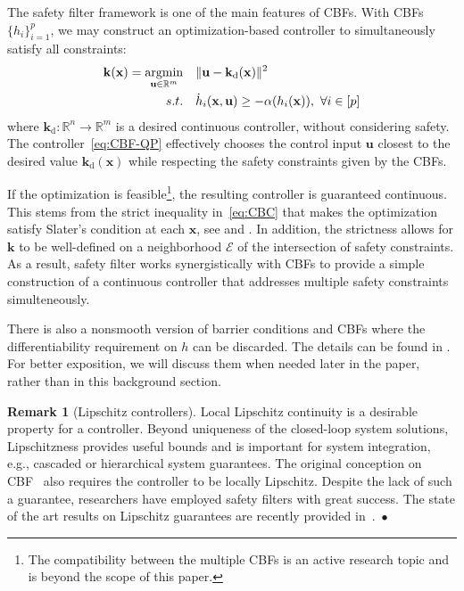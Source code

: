 \documentclass[10pt,a4paper]{amsart}
\newcommand{\real}{\mathbb{R}}
\newcommand{\until}[1]{[#1]}
\newcommand{\map}[3]{#1:#2 \rightarrow #3}
\newcommand{\Ec}{\mathcal{E}}
\theoremstyle{definition}
\newtheorem{remark}{Remark}
\newcommand{\bk}{\mathbf{k}}
\newcommand{\bu}{\mathbf{u}}
\newcommand{\bx}{\mathbf{x}}
\newcommand{\des}{{\operatorname{d}}}
\DeclareMathOperator*{\argmin}{argmin}
\begin{document}
The safety filter framework is one of the main features of CBFs. With CBFs $\{h_i\}_{i=1}^p$, we may construct an optimization-based controller to simultaneously satisfy all constraints:
\begin{align}\label{eq:CBF-QP}
    \bk(\bx)  =\argmin_{\bu\in\real^m} \quad & \|\bu-\bk_\des(\bx)\|^2                                                                  \\
             \textup{s.t.} \quad & \dot h_i(\bx,\bu) \geq -\alpha(h_i(\bx)),~\forall i\in\until{p} \nonumber
\end{align}
where $\map{\bk_\des}{\real^n}{\real^m}$ is a desired continuous controller, without considering safety. The controller~\eqref{eq:CBF-QP} effectively chooses the control input $\bu$ closest to the desired value $\bk_\des(\bx)$ while respecting the safety constraints given by the CBFs.


If the optimization is feasible\footnote{The compatibility between the multiple CBFs is an active research topic and is beyond the scope of this paper.}, the resulting controller is guaranteed continuous. This stems from the strict inequality in~\eqref{eq:CBC} that makes the optimization satisfy Slater's condition at each $\bx$, see \cite[Prop. 2.19]{RAF-PVK:96} and \cite{PM-AA-JC:25}. In addition, the strictness allows for $\bk$ to be well-defined on a neighborhood $\Ec$ of the intersection of safety constraints. As a result, safety filter works synergistically with CBFs to provide a simple construction of a continuous controller that addresses multiple safety constraints simulteneously.

There is also a nonsmooth version of barrier conditions and CBFs where the differentiability requirement on $h$ can be discarded. The details can be found in \cite{PG-JC-ME:17}. For better exposition, we will discuss them when needed later in the paper, rather than in this background section.

\begin{remark}[Lipschitz controllers]
    Local Lipschitz continuity is a desirable property for a controller. Beyond uniqueness of the closed-loop system solutions, Lipschitzness provides useful bounds and is important for system integration, e.g., cascaded or hierarchical system guarantees. The original conception on CBF~\cite{ADA-SC-ME-GN-KS-PT:19} also requires the controller to be locally Lipschitz. Despite the lack of such a guarantee, researchers have employed safety filters with great success. The state of the art results on Lipschitz guarantees are recently provided in~\cite{PM-AA-JC:25}.~\hfill$\bullet$
\end{remark}
\end{document}
